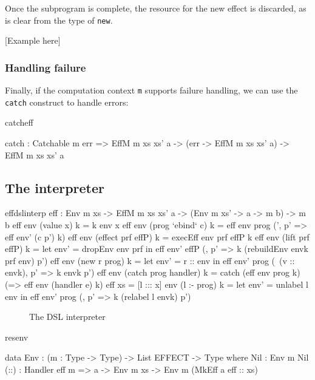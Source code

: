 \noindent
Once the subprogram is complete, the resource for the new effect is discarded,
as is clear from the type of \texttt{new}.

[Example here]

\subsubsection{Handling failure}

Finally, if the computation context \texttt{m} supports failure handling,
we can use the \texttt{catch} construct to handle errors:

\begin{SaveVerbatim}{catcheff}

catch : Catchable m err =>
        EffM m xs xs' a -> (err -> EffM m xs xs' a) ->
        EffM m xs xs' a

\end{SaveVerbatim}


\subsection{The \Eff{} interpreter}

\begin{SaveVerbatim}{effdslinterp}
eff : Env m xs -> EffM m xs xs' a -> (Env m xs' -> a -> m b) -> m b
eff env (value x) k = k env x
eff env (prog `ebind` c) k = eff env prog (\env', p' => eff env' (c p') k)
eff env (effect prf effP) k = execEff env prf effP k
eff env (lift prf effP) k = let env' = dropEnv env prf in 
                                eff env' effP (\envk, p' => k (rebuildEnv envk prf env) p')
eff env (new r prog) k = let env' = r :: env in 
                             eff env' prog (\ (v :: envk), p' => k envk p')
eff env (catch prog handler) k = catch (eff env prog k)
                                       (\e => eff env (handler e) k)
eff {xs = [l ::: x]} env (l :- prog) k = let env' = unlabel {l} env in
                                             eff env' prog (\envk, p' => k (relabel l envk) p')
\end{SaveVerbatim}

\begin{figure*}[t]
\begin{center}
\end{center}
\caption{The \Eff{} DSL interpreter}
\label{effdslimp}
\end{figure*}


\begin{SaveVerbatim}{resenv}

data Env  : (m : Type -> Type) -> 
            List EFFECT -> Type where
     Nil  : Env m Nil
     (::) : Handler eff m => 
            a -> Env m xs -> Env m (MkEff a eff :: xs)

\end{SaveVerbatim}
\label{sect:envdef}

